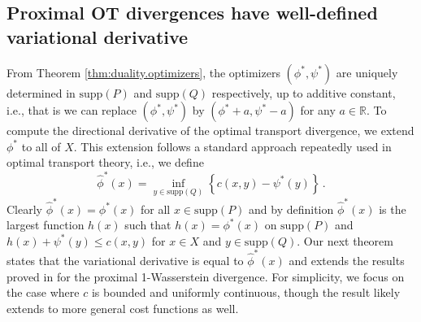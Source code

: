 \documentclass{amsart}
\newcommand{\PB}[1]{\textcolor{magenta}{PB: #1}}
\theoremstyle{definition}
\theoremstyle{remark}
\numberwithin{equation}{section}
\begin{document}
\subsection{Proximal OT divergences have well-defined variational derivative }\label{sec:firstvariation}
From Theorem \ref{thm:duality.optimizers}, the optimizers $(\phi^*,\psi^*)$  are uniquely determined in $\textrm{supp}(P)$ and $\textrm{supp}(Q)$ respectively,  up to additive constant, i.e., that is we can replace $(\phi^*,\psi^*)$ by $( \phi^* + a,\psi^*-a)$ for any $a\in \mathbb{R}$.
To compute the directional derivative of the optimal transport divergence, we extend $\phi^*$ to all of $X$. This extension follows a standard approach repeatedly used in optimal transport theory, i.e.,  we define
\begin{equation}\label{eq:phistarextension}
\widehat{\phi}^*(x) = \inf_{y \in \textrm{supp}(Q)} \left\{ c(x,y)- \psi^*(y) \right\} \,.
\end{equation}
 Clearly $\widehat{\phi}^*(x)=\phi^*(x)$ for all $x \in \textrm{supp}(P)$ and by definition $\widehat{\phi}^*(x)$ is the largest
function $h(x)$ such that $h(x)=\phi^*(x)$ on $\textrm{supp}(P)$ and $h(x)+\psi^*(y)\le c(x,y)$ 
for $x\in X$ and $y \in \textrm{supp}(Q)$.  Our next theorem states that the variational derivative is equal to $\widehat{\phi}^*(x)$ and extends the results proved in \cite{dupuis2022formulation,Gu_GPA} for the proximal 1-Wasserstein divergence. For simplicity, we focus on the case where $c$ is bounded and uniformly continuous, though the result likely extends to more general cost functions as well.
\end{document}
